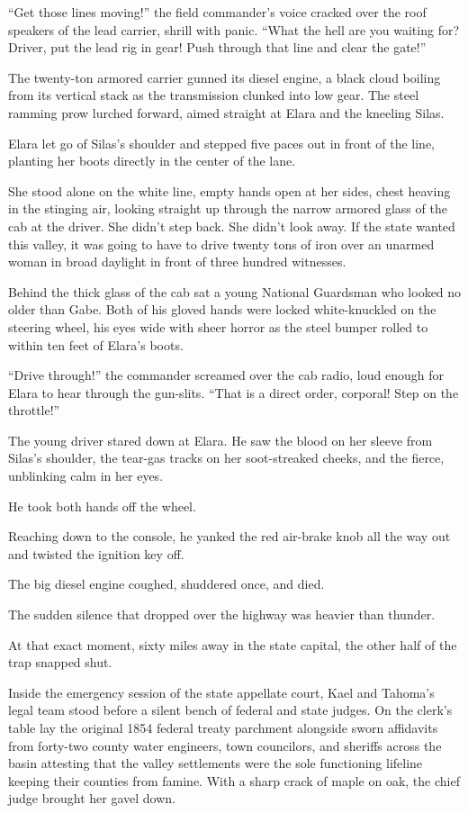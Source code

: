 ``Get those lines moving!'' the field commander’s voice cracked over the roof speakers of the lead carrier, shrill with panic. ``What the hell are you waiting for? Driver, put the lead rig in gear! Push through that line and clear the gate!''

The twenty-ton armored carrier gunned its diesel engine, a black cloud boiling from its vertical stack as the transmission clunked into low gear. The steel ramming prow lurched forward, aimed straight at Elara and the kneeling Silas.

Elara let go of Silas's shoulder and stepped five paces out in front of the line, planting her boots directly in the center of the lane. 

She stood alone on the white line, empty hands open at her sides, chest heaving in the stinging air, looking straight up through the narrow armored glass of the cab at the driver. She didn't step back. She didn't look away. If the state wanted this valley, it was going to have to drive twenty tons of iron over an unarmed woman in broad daylight in front of three hundred witnesses.

Behind the thick glass of the cab sat a young National Guardsman who looked no older than Gabe. Both of his gloved hands were locked white-knuckled on the steering wheel, his eyes wide with sheer horror as the steel bumper rolled to within ten feet of Elara’s boots.

``Drive through!'' the commander screamed over the cab radio, loud enough for Elara to hear through the gun-slits. ``That is a direct order, corporal! Step on the throttle!''

The young driver stared down at Elara. He saw the blood on her sleeve from Silas’s shoulder, the tear-gas tracks on her soot-streaked cheeks, and the fierce, unblinking calm in her eyes. 

He took both hands off the wheel. 

Reaching down to the console, he yanked the red air-brake knob all the way out and twisted the ignition key off. 

The big diesel engine coughed, shuddered once, and died. 

The sudden silence that dropped over the highway was heavier than thunder.

At that exact moment, sixty miles away in the state capital, the other half of the trap snapped shut.

Inside the emergency session of the state appellate court, Kael and Tahoma’s legal team stood before a silent bench of federal and state judges. On the clerk’s table lay the original 1854 federal treaty parchment alongside sworn affidavits from forty-two county water engineers, town councilors, and sheriffs across the basin attesting that the valley settlements were the sole functioning lifeline keeping their counties from famine. With a sharp crack of maple on oak, the chief judge brought her gavel down. 

